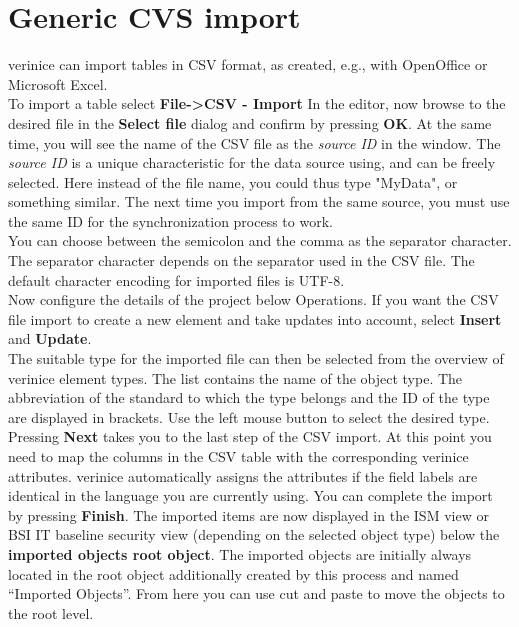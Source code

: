 \documentclass[a4paper,10pt]{book}
\begin{document}
\section{Generic CVS import} \label{sec:generic-csv-import}
verinice can import tables in CSV format, as created, e.g., with OpenOffice or Microsoft Excel.
\newline\\
To import a table select \textbf{File-\textgreater CSV - Import} In the editor, now browse to the desired file in the
\textbf{Select file} dialog and confirm by pressing \textbf{OK}. At the same time, you will see the name of the CSV file as the
\textit{source ID} in the window. The \textit{source ID} is a unique characteristic for the data source using, and can be
freely selected. Here instead of the file name, you could thus type "MyData", or something similar. The next
time you import from the same source, you must use the same ID for the synchronization process to work.
\newline\\
You can choose between the semicolon and the comma as the separator character. The separator character
depends on the separator used in the CSV file. The default character encoding for imported files is UTF-8.
\newline\\
Now configure the details of the project below Operations. If you want the CSV file import to create a new
element and take updates into account, select \textbf{Insert} and \textbf{Update}.
\newline\\
The suitable type for the imported file can then be selected from the overview of verinice element types. The list contains the name of the object type. The abbreviation of the standard to which the type belongs and the ID of the type are displayed in brackets. Use the left mouse button to select the desired type.
\newline\\
Pressing \textbf{Next} takes you to the last step of the CSV import. At this point you need to map the
columns in the CSV table with the corresponding verinice attributes. verinice automatically assigns the
attributes if the field labels are identical in the language you are currently using. You can complete the
import by pressing \textbf{Finish}. The imported items are now displayed in the ISM view or BSI IT baseline
security view (depending on the selected object type) below the \textbf{imported objects root object}.
The imported objects are initially always located in the root object additionally created by this process
and named ``Imported Objects''. From here you can use cut and paste to move the objects to the root level.
\end{document}
